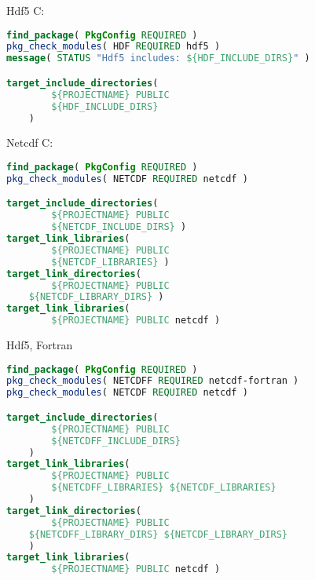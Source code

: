 

\begin{numberedframe}{Hdf5}
C:
\begin{lstlisting}[language=CMake]
find_package( PkgConfig REQUIRED )
pkg_check_modules( HDF REQUIRED hdf5 )
message( STATUS "Hdf5 includes: ${HDF_INCLUDE_DIRS}" )

target_include_directories(
        ${PROJECTNAME} PUBLIC
        ${HDF_INCLUDE_DIRS}
	)
\end{lstlisting}
\end{numberedframe}

\begin{numberedframe}{Netcdf}
C:
\begin{lstlisting}[language=CMake]
find_package( PkgConfig REQUIRED )
pkg_check_modules( NETCDF REQUIRED netcdf )

target_include_directories(
        ${PROJECTNAME} PUBLIC
        ${NETCDF_INCLUDE_DIRS} )
target_link_libraries(
        ${PROJECTNAME} PUBLIC
        ${NETCDF_LIBRARIES} )
target_link_directories(
        ${PROJECTNAME} PUBLIC
	${NETCDF_LIBRARY_DIRS} )
target_link_libraries(
        ${PROJECTNAME} PUBLIC netcdf )
\end{lstlisting}
\end{numberedframe}

\begin{numberedframe}{Hdf5, Fortran}
\begin{lstlisting}[language=CMake]
find_package( PkgConfig REQUIRED )
pkg_check_modules( NETCDFF REQUIRED netcdf-fortran )
pkg_check_modules( NETCDF REQUIRED netcdf )

target_include_directories(
        ${PROJECTNAME} PUBLIC
        ${NETCDFF_INCLUDE_DIRS}
	)
target_link_libraries(
        ${PROJECTNAME} PUBLIC
        ${NETCDFF_LIBRARIES} ${NETCDF_LIBRARIES}
	)
target_link_directories(
        ${PROJECTNAME} PUBLIC
	${NETCDFF_LIBRARY_DIRS}	${NETCDF_LIBRARY_DIRS}
	)
target_link_libraries(
        ${PROJECTNAME} PUBLIC netcdf )
\end{lstlisting}
\end{numberedframe}

